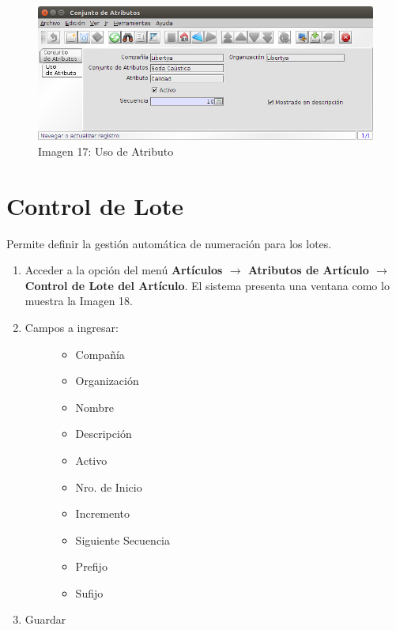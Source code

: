 \documentclass[letterpaper,10pt,spanish]{sphinxmanual}
\begin{document}
\begin{figure}[htbp]
\centering
\capstart

\includegraphics{ly_conjattr_2.png}
\caption{Imagen 17: Uso de Atributo}\end{figure}


\section{Control de Lote}
\label{maestros:control-de-lote}
Permite definir la gestión automática de numeración para los lotes.
\begin{enumerate}
\item {} 
Acceder a la opción del menú \textbf{Artículos \(\rightarrow\)  Atributos de Artículo \(\rightarrow\) Control de Lote del Artículo}. El sistema presenta una ventana como lo muestra la Imagen 18.

\item {} \begin{description}
\item[{Campos a ingresar:}] \leavevmode\begin{itemize}
\item {} 
Compañía

\item {} 
Organización

\item {} 
Nombre

\item {} 
Descripción

\item {} 
Activo

\item {} 
Nro. de Inicio

\item {} 
Incremento

\item {} 
Siguiente Secuencia

\item {} 
Prefijo

\item {} 
Sufijo

\end{itemize}

\end{description}

\item {} 
Guardar

\end{enumerate}
\end{document}
